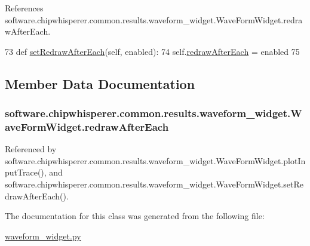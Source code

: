 References software.\+chipwhisperer.\+common.\+results.\+waveform\+\_\+widget.\+Wave\+Form\+Widget.\+redraw\+After\+Each.


\begin{DoxyCode}
73     \textcolor{keyword}{def }\hyperlink{classsoftware_1_1chipwhisperer_1_1common_1_1results_1_1waveform__widget_1_1WaveFormWidget_a30d46f17faf50a747d563441d90d0a6c}{setRedrawAfterEach}(self, enabled):
74         self.\hyperlink{classsoftware_1_1chipwhisperer_1_1common_1_1results_1_1waveform__widget_1_1WaveFormWidget_a1ab3d2b50abef54a20f88960c8cc1a10}{redrawAfterEach} = enabled
75 
\end{DoxyCode}


\subsection{Member Data Documentation}
\hypertarget{classsoftware_1_1chipwhisperer_1_1common_1_1results_1_1waveform__widget_1_1WaveFormWidget_a1ab3d2b50abef54a20f88960c8cc1a10}{}
\subsubsection[{redraw\+After\+Each}]{\setlength{\rightskip}{0pt plus 5cm}software.\+chipwhisperer.\+common.\+results.\+waveform\+\_\+widget.\+Wave\+Form\+Widget.\+redraw\+After\+Each}\label{classsoftware_1_1chipwhisperer_1_1common_1_1results_1_1waveform__widget_1_1WaveFormWidget_a1ab3d2b50abef54a20f88960c8cc1a10}


Referenced by software.\+chipwhisperer.\+common.\+results.\+waveform\+\_\+widget.\+Wave\+Form\+Widget.\+plot\+Input\+Trace(), and software.\+chipwhisperer.\+common.\+results.\+waveform\+\_\+widget.\+Wave\+Form\+Widget.\+set\+Redraw\+After\+Each().



The documentation for this class was generated from the following file\+:\begin{DoxyCompactItemize}
\item 
\hyperlink{waveform__widget_8py}{waveform\+\_\+widget.\+py}\end{DoxyCompactItemize}

